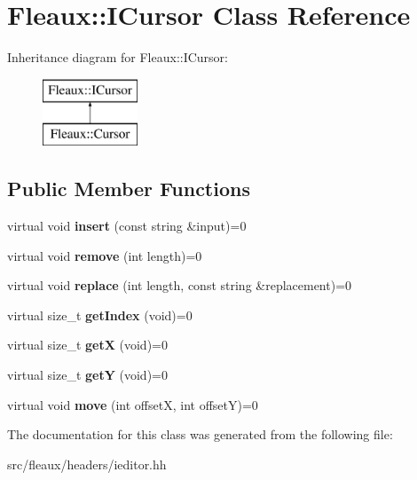 \hypertarget{classFleaux_1_1ICursor}{}\section{Fleaux\+:\+:I\+Cursor Class Reference}
\label{classFleaux_1_1ICursor}
Inheritance diagram for Fleaux\+:\+:I\+Cursor\+:\begin{figure}[H]
\begin{center}
\leavevmode
\includegraphics[height=2.000000cm]{classFleaux_1_1ICursor}
\end{center}
\end{figure}
\subsection*{Public Member Functions}
\begin{DoxyCompactItemize}
\item 
\hypertarget{classFleaux_1_1ICursor_a1293fc286aa66c2cfe1ba01096692073}{}virtual void {\bfseries insert} (const string \&input)=0\label{classFleaux_1_1ICursor_a1293fc286aa66c2cfe1ba01096692073}

\item 
\hypertarget{classFleaux_1_1ICursor_a0b236476cce265d4daf66a4dffc413b4}{}virtual void {\bfseries remove} (int length)=0\label{classFleaux_1_1ICursor_a0b236476cce265d4daf66a4dffc413b4}

\item 
\hypertarget{classFleaux_1_1ICursor_a0d6b32530ce9e5cdafd0d8e7e003b80f}{}virtual void {\bfseries replace} (int length, const string \&replacement)=0\label{classFleaux_1_1ICursor_a0d6b32530ce9e5cdafd0d8e7e003b80f}

\item 
\hypertarget{classFleaux_1_1ICursor_ae0aa625b46f91b0b46b5e582a2e1b0cf}{}virtual size\+\_\+t {\bfseries get\+Index} (void)=0\label{classFleaux_1_1ICursor_ae0aa625b46f91b0b46b5e582a2e1b0cf}

\item 
\hypertarget{classFleaux_1_1ICursor_a3aaabae93328864c7340dc71d9c9d4ca}{}virtual size\+\_\+t {\bfseries get\+X} (void)=0\label{classFleaux_1_1ICursor_a3aaabae93328864c7340dc71d9c9d4ca}

\item 
\hypertarget{classFleaux_1_1ICursor_ad0132bf4aad3ce917bf066eb2d0d2692}{}virtual size\+\_\+t {\bfseries get\+Y} (void)=0\label{classFleaux_1_1ICursor_ad0132bf4aad3ce917bf066eb2d0d2692}

\item 
\hypertarget{classFleaux_1_1ICursor_a77702f090f961857f53a06d9fb2f73b2}{}virtual void {\bfseries move} (int offset\+X, int offset\+Y)=0\label{classFleaux_1_1ICursor_a77702f090f961857f53a06d9fb2f73b2}

\end{DoxyCompactItemize}


The documentation for this class was generated from the following file\+:\begin{DoxyCompactItemize}
\item 
src/fleaux/headers/ieditor.\+hh\end{DoxyCompactItemize}
